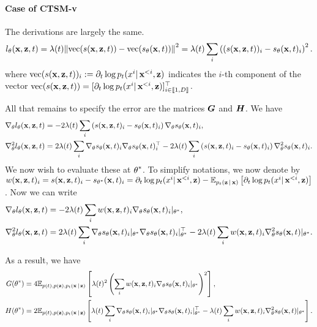 \paragraph{Case of CTSM-v}
The derivations are largely the same.
\begin{equation}
l_{\btheta}(\bx,\bz,t) 
= 
\lambda(t) \norm{
\text{vec}(s(\bx,\bz,t)) - \text{vec}(s_{\btheta}(\bx,t))
}^{2} 
= 
\lambda(t) \sum_{i}
\left( (s(\bx,\bz,t))_{i} - s_{\btheta}(\bx,t)_{i}\right)^{2}.
\end{equation}
where $\text{vec}(s(\bx,\bz,t))_{i} := \partial_t \log p_t(x^i | \bx^{<i}, \bz)$ indicates the $i$-th component of the vector $\text{vec}(s(\bx,\bz,t))=[\partial_t \log p_t(x^i | \bx^{<i}, \bz)]_{i \in \llbracket 1, D \rrbracket}^\top$. 

All that remains to specify the error are the matrices $\mG$ and $\mH$. We have
\begin{align}
\nabla_{\btheta}l_{\btheta}(\bx,\bz,t) &= -2 \lambda(t) \sum_{i}\left(s(\bx,\bz,t)_{i} - s_{\btheta}(\bx,t)_{i}\right) \nabla_{\btheta}s_{\btheta}(\bx,t)_{i},\\
\nabla^{2}_{\btheta}l_{\btheta}(\bx,\bz,t) &= 2\lambda(t)\sum_{i}\nabla_{\btheta}s_{\btheta}(\bx,t)_{i}\nabla_{\btheta}s_{\btheta}(\bx,t)_{i}^{\top} - 2 \lambda(t) \sum_{i}\left(s(\bx,\bz,t)_{i} - s_{\btheta}(\bx,t)_{i}\right)\nabla_{\btheta}^{2}s_{\btheta}(\bx,t)_{i}.
\end{align}
We now wish to evaluate these at $\btheta^{*}$. To simplify notations, we now denote by 
$w(\bx, \bz, t)_{i} = s(\bx,\bz,t)_{i} - s_{\btheta^*}(\bx,t)_{i} = \partial_t \log p_t(x^i | \bx^{<i}, \bz) - \E_{p_{t}(\bz|\bx)}\left[\partial_t \log p_t(x^i | \bx^{<i}, \bz)\right]$.
Now we can write
\begin{align}
\nabla_{\btheta}l_{\btheta}(\bx,\bz,t) &= -2\lambda(t) \sum_{i}w(\bx,\bz,t)_{i} \nabla_{\btheta}s_{\btheta}(\bx,t)_{i}|_{\btheta^*},\\
\nabla_{\btheta}^{2}l_{\btheta}(\bx,\bz,t) &= 2\lambda(t)\sum_{i}\nabla_{\btheta}s_{\btheta}(\bx,t)_{i}|_{\btheta^{*}}\nabla_{\btheta}s_{\btheta}(\bx,t)_{i}|_{\btheta^{*}}^{\top} -2\lambda(t)\sum_{i}w(\bx,\bz,t)_{i}\nabla_{\btheta}^{2}s_{\btheta}(\bx,t)|_{\btheta^{*}}.
\end{align}

As a result, we have
\begin{align}
\label{eq:ctsm_v_matrices}
G(\btheta^{*}) &= 4\E_{p(t),p(\bz),p_{t}(\bx|\bz)}\left[\lambda(t)^{2} \left(\sum_{i}w(\bx,\bz,t)_{i} \nabla_{\btheta}s_{\btheta}(\bx,t)_{i}|_{\btheta^*}\right)^{2}\right],\\
H(\btheta^{*}) &= 2\E_{p(t),p(\bz),p_{t}(\bx|\bz)}\left[\lambda(t)\sum_{i}\nabla_{\btheta}s_{\btheta}(\bx,t)_{i}|_{\btheta^{*}}\nabla_{\btheta}s_{\btheta}(\bx,t)_{i}|_{\btheta^{*}}^{\top} -\lambda(t)\sum_{i}w(\bx,\bz,t)_{i}\nabla_{\btheta}^{2}s_{\btheta}(\bx,t)|_{\btheta^{*}}\right].
\end{align}

